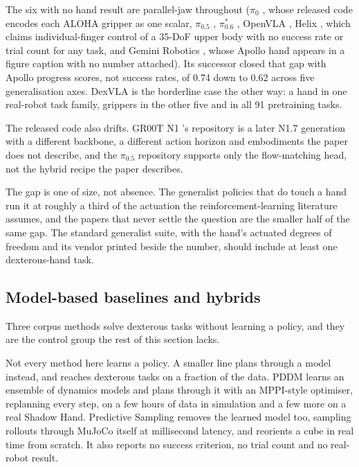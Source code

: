 The six with no hand result are parallel-jaw throughout ($\pi_0$ \cite{pi0_2024}, whose released
code encodes each ALOHA gripper as one scalar, $\pi_{0.5}$ \cite{pi05_2025}, $\pi^{*}_{0.6}$
\cite{pistar06_2025}, OpenVLA \cite{openvla_2024}, Helix \cite{helix_2025}, which claims
individual-finger control of a 35-DoF upper body with no success rate or trial count for any task,
and Gemini Robotics \cite{gemini_robotics_2025}, whose Apollo hand appears in a figure caption
with no number attached). Its successor \cite{gemini_robotics_15_2025} closed that gap with Apollo
progress scores, not success rates, of 0.74 down to 0.62 across five generalisation axes. DexVLA
\cite{dexvla_2025} is the borderline case the other way: a hand in one real-robot task family,
grippers in the other five and in all 91 pretraining tasks.

The released code also drifts. GR00T N1 \cite{groot_n1_2025}'s repository is a later N1.7
generation with a different backbone, a different action horizon and embodiments the paper does
not describe, and the $\pi_{0.5}$ repository \cite{pi05_2025} supports only the flow-matching
head, not the hybrid recipe the paper describes.

The gap is one of size, not absence. The
generalist policies that do touch a hand run it at roughly a third of the actuation the
reinforcement-learning literature assumes, and the papers that never settle the question are the
smaller half of the same gap. The standard
generalist suite, with the hand's actuated degrees of freedom and its vendor printed beside the
number, should include at least one dexterous-hand task.

\subsection{Model-based baselines and hybrids}
\label{sec:train:mbc}

Three corpus methods solve dexterous tasks without learning a policy, and they are the control
group the rest of this section lacks.

Not every method here learns a policy. A smaller line plans through a model instead, and reaches
dexterous tasks on a fraction of the data. PDDM \cite{pddm_2019} learns an ensemble of dynamics
models and plans through it with an MPPI-style optimiser, replanning every step, on a few hours of
data in simulation and a few more on a real Shadow Hand. Predictive Sampling \cite{mjpc_2022}
removes the learned model too, sampling rollouts through MuJoCo itself at millisecond latency, and
reorients a cube in real time from scratch. It also reports no success criterion, no trial count
and no real-robot result.

